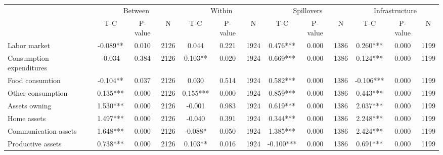 
\begin{tabular}{l*{12}{c}}\hline&\multicolumn{3}{c}{Between}&\multicolumn{3}{c}{Within}&\multicolumn{3}{c}{Spillovers}&\multicolumn{3}{c}{Infrastructure} \\ \cmidrule(r){2-4}\cmidrule(l){5-7}\cmidrule(l){8-10}\cmidrule(l){9-13} & {T-C} & {P-value} & {N} & {T-C} & {P-value} & {N}  & {T-C} & {P-value} & {N} & {T-C} & {P-value} & {N} \\ \midrule

 Labor market &       -0.089** &        0.010 & 2126    &        0.044 &        0.221 & 1924    &        0.476*** &        0.000 & 1386 &        0.260*** &        0.000 & 1199 \\ 

 Consumption expenditures &       -0.034 &        0.384 & 2126    &        0.103** &        0.020 & 1924    &        0.669*** &        0.000 & 1386 &        0.124*** &        0.000 & 1199 \\ 

 Food consumtion &       -0.104** &        0.037 & 2126    &        0.030 &        0.514 & 1924    &        0.582*** &        0.000 & 1386 &       -0.106*** &        0.000 & 1199 \\ 

 Other consumption &        0.135*** &        0.000 & 2126    &        0.155*** &        0.000 & 1924    &        0.859*** &        0.000 & 1386 &        0.443*** &        0.000 & 1199 \\ 

 Assets owning &        1.530*** &        0.000 & 2126    &       -0.001 &        0.983 & 1924    &        0.619*** &        0.000 & 1386 &        2.037*** &        0.000 & 1199 \\ 

 Home assets &        1.497*** &        0.000 & 2126    &       -0.040 &        0.391 & 1924    &        0.344*** &        0.000 & 1386 &        2.248*** &        0.000 & 1199 \\ 

 Communication assets &        1.648*** &        0.000 & 2126    &       -0.088* &        0.050 & 1924    &        1.385*** &        0.000 & 1386 &        2.424*** &        0.000 & 1199 \\ 

 Productive assets &        0.738*** &        0.000 & 2126    &        0.103** &        0.016 & 1924    &       -0.100*** &        0.000 & 1386 &        0.691*** &        0.000 & 1199 \\ 


\end{tabular}
